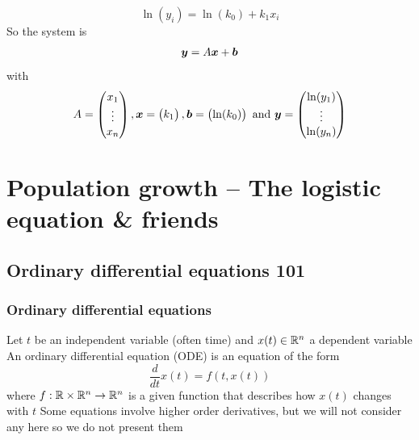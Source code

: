 \documentclass[aspectratio=169]{beamer}
\begin{document}
\begin{frame}
\[
\ln(y_i) = \ln (k_0)+k_1x_i
\]
So the system is
\begin{align*}
\bm{y} = A\bm{x}+\bm{b}
\end{align*}
with
\[
A = \begin{pmatrix}
x_1\\ \vdots \\ x_n
\end{pmatrix},
\bm{x} = \begin{pmatrix}
k_1
\end{pmatrix},
\bm{b} = \begin{pmatrix}
\ln (k_0)
\end{pmatrix}
\textrm{ and }
\bm{y} = \begin{pmatrix}
\ln (y_1)\\ \vdots\\ \ln (y_n)
\end{pmatrix}
\]
\end{frame}


\section{Population growth -- The logistic equation \& friends}


\subsection{Ordinary differential equations 101}



\begin{frame}\frametitle{Ordinary differential equations}
Let $t$ be an independent variable (often time) and $x(t)\in\mathbb{R}^n$ a dependent variable
\vfill
An ordinary differential equation (ODE) is an equation of the form
\[
\frac{d}{dt}x(t) = f(t,x(t))
\]
where $f:\mathbb{R}\times\mathbb{R}^n\to\mathbb{R}^n$ is a given function that describes how $x(t)$ changes with $t$
\vfill
Some equations involve higher order derivatives, but we will not consider any here so we do not present them
\end{frame}
\end{document}
